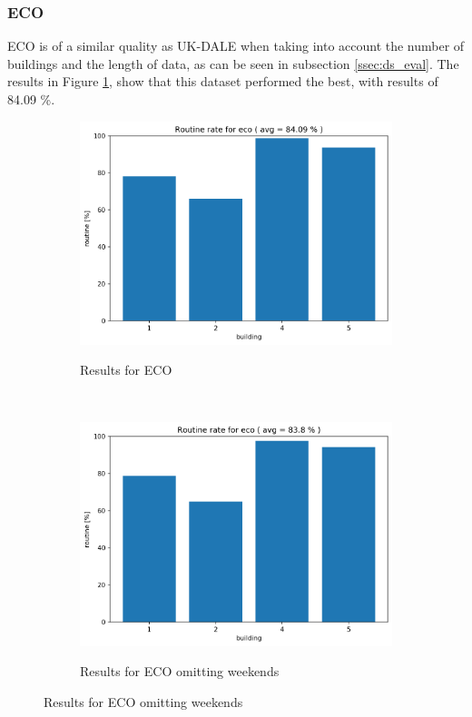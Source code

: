 \subsubsection{ECO}

ECO is of a similar quality as UK-DALE when taking into account the number of buildings and the length of data, as can be seen in subsection \ref{ssec:ds_eval}.
The results in Figure \ref{fig:eco_res}, show that this dataset performed the best, with results of 84.09 \%.

\begin{figure}[H]
	\begin{subfigure}{.5\textwidth}
        \caption{Results for ECO}
        \includegraphics[width=1\textwidth]{Figures/EC/eco_res_nw_1.png}
        \label{fig:eco_res}
    \end{subfigure}
    ~ 
    \begin{subfigure}{.5\textwidth}
        \caption{Results for ECO omitting weekends}
        \includegraphics[width=1\textwidth]{Figures/EC/eco_res.png}
        \label{fig:eco_res_nw}
    \end{subfigure}
\end{figure}

